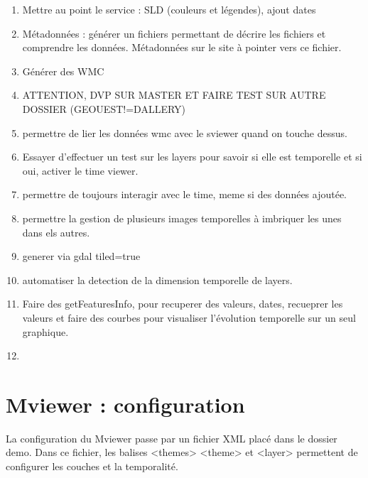 \documentclass[10pt,a4paper]{article}
\begin{document}
\begin{enumerate}
\item Mettre au point le service : SLD (couleurs et légendes), ajout dates
\item Métadonnées : générer un fichiers permettant de décrire les fichiers et comprendre les données. Métadonnées sur le site à pointer vers ce fichier.
\item Générer des WMC
\item ATTENTION, DVP SUR MASTER ET FAIRE TEST SUR AUTRE DOSSIER (GEOUEST!=DALLERY)
\item permettre de lier les données wmc avec le sviewer quand on touche dessus.
\item Essayer d'effectuer un test sur les layers pour savoir si elle est temporelle et si oui, activer le time viewer.
\item permettre de toujours interagir avec le time, meme si des données ajoutée.
\item permettre la gestion de plusieurs images temporelles à imbriquer les unes dans els autres.
\item generer via gdal tiled=true
\item automatiser la detection de la dimension temporelle de layers.
\item Faire des getFeaturesInfo, pour recuperer des valeurs, dates, recueprer les valeurs et faire des courbes pour visualiser l'évolution temporelle sur un seul graphique.
\item 
\end{enumerate}

\section{Mviewer : configuration}
La configuration du Mviewer passe par un fichier XML placé dans le dossier demo. Dans ce fichier, les balises <themes> <theme> et <layer> permettent de configurer les couches et la temporalité.
\end{document}
